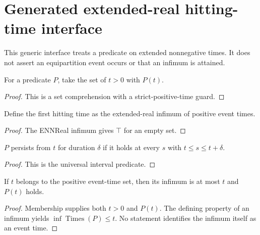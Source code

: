 
\chapter{Generated extended-real hitting-time interface}
\label{ch:ArchonPhysics_Generated_problem_hitting_time}

This generic interface treats a predicate on extended nonnegative times. It does not assert an equipartition event occurs or that an infimum is attained.

\begin{definition}
\label{def:hitting:times}
For a predicate $P$, take the set of $t>0$ with $P(t)$.
\end{definition}
\begin{proof}This is a set comprehension with a strict-positive-time guard.\end{proof}

\begin{definition}
\label{def:hitting:time}
Define the first hitting time as the extended-real infimum of positive event times.
\end{definition}
\begin{proof}The ENNReal infimum gives $\top$ for an empty set.\end{proof}

\begin{definition}
\label{def:hitting:persistence}
$P$ persists from $t$ for duration $\delta$ if it holds at every $s$ with $t\le s\le t+\delta$.
\end{definition}
\begin{proof}This is the universal interval predicate.\end{proof}

\begin{theorem}
\label{thm:physics:hitting_time:target}
If $t$ belongs to the positive event-time set, then its infimum is at most $t$ and $P(t)$ holds.
\end{theorem}
\begin{proof}Membership supplies both $t>0$ and $P(t)$. The defining property of an infimum yields $\inf\operatorname{Times}(P)\le t$. No statement identifies the infimum itself as an event time.
\end{proof}
